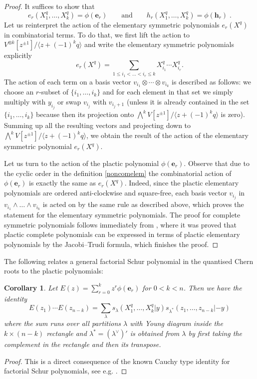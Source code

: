 \documentclass[12pt]{amsart}
\newcommand{\bs}[1]{\boldsymbol{#1}}
\newtheorem{cor}[prop]{Corollary}
\numberwithin{equation}{section}
\numberwithin{figure}{section}
\begin{document}
    \begin{proof}
        It suffices to show that
        \[
        e_r(X_1^q,\ldots,X^q_k)=\phi(\bs{e}_r)\qquad\text{and}\qquad h_r(X^q_1,\ldots,X^q_k)=\phi(\bs{h}_r)\;.
        \]
        Let us reinterpret the action of the elementary symmetric polynomials $e_r(X^q)$ in combinatorial terms. To do that, we first lift the action to $V^{\otimes k}[z^{\pm 1}]/\langle z + (-1)^kq\rangle$ and write the elementary symmetric polynomials explicitly
        \[
        e_r(X^q) = \sum\limits_{1\le i_1 < \ldots<i_r\le k} X^q_{i_1} \cdots X^q_{i_r}.
        \]
        The action of each term on a basis vector $v_{i_1}\otimes\cdots\otimes v_{i_k}$ is described as follows: we choose an $r$-subset of $\{i_1,\ldots,i_k\}$ and for each element in that set we simply multiply with $y_{i_j}$ or swap $v_{i_j}$ with $v_{i_j+1}$ (unless it is already contained in the set $\{i_1,\ldots,i_k\}$ because then its projection onto $\bigwedge^kV[z^{\pm 1}]/\langle z + (-1)^kq\rangle$ is zero). Summing up all the resulting vectors and projecting down to $\bigwedge^k V[z^{\pm 1}]/\langle z + (-1)^kq\rangle$, we obtain the result of the action of the elementary symmetric polynomial $e_r(X^q)$. 

        Let us turn to the action of the plactic polynomial $\phi(\bs{e}_r)$. Observe that due to the cyclic order in the definition  \eqref{noncomelem} the combinatorial action of $\phi(\bs{e}_r)$ is exactly the same as $e_r(X^q)$. Indeed, since the plactic elementary polynomials are ordered anti-clockwise and square-free, each basis vector $v_{i_j}$ in $v_{i_1}\wedge\ldots\wedge v_{i_k}$ is acted on by the same rule as described above, which proves the statement for the elementary symmetric polynomials. The proof for complete symmetric polynomials follows immediately from \cite[Def. 5.16, Cor. 6.9]{korffstroppel2010}, where it was proved that plactic complete polynomials can be expressed in terms of plactic elementary polynomials by the Jacobi--Trudi formula, which finishes the proof. 
    \end{proof}
    
The following relates a general factorial Schur polynomial in the quantised Chern roots to the plactic polynomials:
\begin{cor}
    Let $E(z)=\sum_{r=0}^kz^r\phi(\bs{e}_r)$ for $0<k<n$. Then we have the identity
    \begin{equation}
        E(z_1)\cdots E(z_{n-k})=\sum_{\lambda}s_{\lambda}(X_1^q,\ldots,X^q_k|y)s_{\lambda^*}(z_1,\ldots,z_{n-k}|-y)
    \end{equation}
    where the sum runs over all partitions $\lambda$ with Young diagram inside the $k\times (n-k)$ rectangle and $\lambda^*=(\lambda^\vee)'$ is obtained from $\lambda$ by first taking the complement in the rectangle and then its transpose.
\end{cor}
\begin{proof}
    This is a direct consequence of the known Cauchy type identity for factorial Schur polynomials, see e.g. \cite[Eqn 6.17]{Mac92}.
\end{proof}
\end{document}
